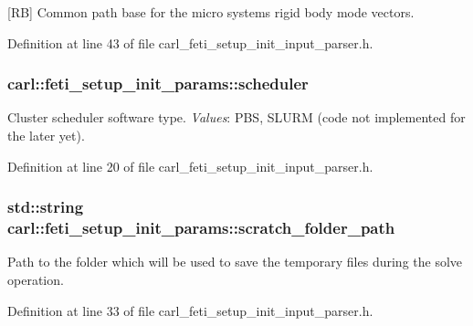 \mbox{[}R\+B\mbox{]} Common path base for the micro system\textquotesingle{}s rigid body mode vectors. 



Definition at line 43 of file carl\+\_\+feti\+\_\+setup\+\_\+init\+\_\+input\+\_\+parser.\+h.

\hypertarget{structcarl_1_1feti__setup__init__params_ad1c1983a2374aa46f19ed79f8196f6d6}{}
\subsubsection[{scheduler}]{ carl\+::feti\+\_\+setup\+\_\+init\+\_\+params\+::scheduler}\label{structcarl_1_1feti__setup__init__params_ad1c1983a2374aa46f19ed79f8196f6d6}


Cluster scheduler software type. {\itshape Values}\+: P\+B\+S, S\+L\+U\+R\+M (code not implemented for the later yet). 



Definition at line 20 of file carl\+\_\+feti\+\_\+setup\+\_\+init\+\_\+input\+\_\+parser.\+h.

\hypertarget{structcarl_1_1feti__setup__init__params_a57e553748427905076bae85d239f9537}{}
\subsubsection[{scratch\+\_\+folder\+\_\+path}]{\setlength{\rightskip}{0pt plus 5cm}std\+::string carl\+::feti\+\_\+setup\+\_\+init\+\_\+params\+::scratch\+\_\+folder\+\_\+path}\label{structcarl_1_1feti__setup__init__params_a57e553748427905076bae85d239f9537}


Path to the folder which will be used to save the temporary files during the solve operation. 



Definition at line 33 of file carl\+\_\+feti\+\_\+setup\+\_\+init\+\_\+input\+\_\+parser.\+h.

